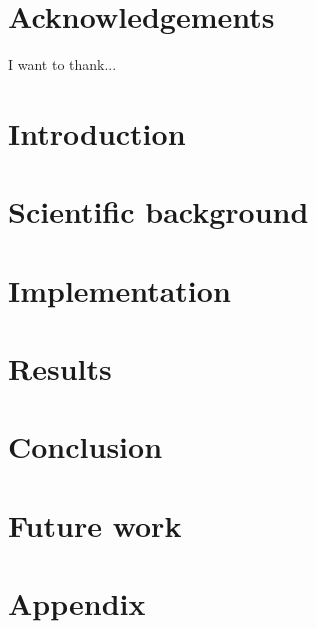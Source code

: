 \documentclass[12pt, twoside]{report}
\begin{document}




\chapter*{Acknowledgements}
I want to thank...

\tableofcontents

\listoffigures

\listoftables

\chapter{Introduction}


\chapter{Scientific background}


\chapter{Implementation}


\chapter{Results}


\chapter{Conclusion}


\chapter{Future work}


\appendix
\chapter{Appendix}

\end{document}
